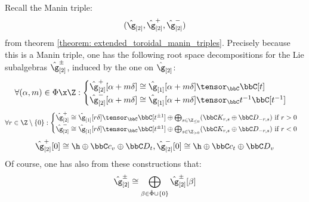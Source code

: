         \begin{corollary}
            Recall the Manin triple:
                $$(\hat{\g}_{[2]}, \hat{\g}_{[2]}^+, \hat{\g}_{[2]}^-)$$
            from theorem \ref{theorem: extended_toroidal_manin_triples}. Precisely because this is a Manin triple, one has the following root space decompositions for the Lie subalgebras $\hat{\g}_{[2]}^{\pm}$, induced by the one on $\hat{\g}_{[2]}$:
                $$
                    \forall (\alpha, m) \in \Phi \x \Z:
                    \begin{cases}
                        \hat{\g}_{[2]}^+[\alpha + m\delta] \cong \hat{\g}_{[1]}[\alpha + m\delta] \tensor_{\bbC} \bbC[t]
                        \\
                        \hat{\g}_{[2]}^-[\alpha + m\delta] \cong \hat{\g}_{[1]}[\alpha + m\delta] \tensor_{\bbC} t^{-1}\bbC[t^{-1}]
                    \end{cases}
                $$
                $$
                    \forall r \in \Z \setminus \{0\}:
                    \begin{cases}
                        \text{$\hat{\g}_{[2]}^+ \cong \hat{\g}_{[1]}[r \delta] \tensor_{\bbC} \bbC[t^{\pm 1}] \oplus \bigoplus_{s \in \Z_{\leq 0}} (\bbC K_{r, s} \oplus \bbC D_{-r, s})$ if $r > 0$}
                        \\
                        \text{$\hat{\g}_{[2]}^- \cong \hat{\g}_{[1]}[r \delta] \tensor_{\bbC} \bbC[t^{\pm 1}] \oplus \bigoplus_{s \in \Z_{> 0}} (\bbC K_{r, s} \oplus \bbC D_{-r, s})$ if $r < 0$}
                    \end{cases}
                $$
                $$\hat{\g}_{[2]}^+[0] \cong \h \oplus \bbC c_v \oplus \bbC D_t, \hat{\g}_{[2]}^-[0] \cong \h \oplus \bbC c_t \oplus \bbC D_v$$
            Of course, one has also from these constructions that:
                $$\hat{\g}_{[2]}^{\pm} \cong \bigoplus_{\beta \in \hat{\Phi} \cup \{0\}} \hat{\g}_{[2]}^{\pm}[\beta]$$
        \end{corollary}
        

